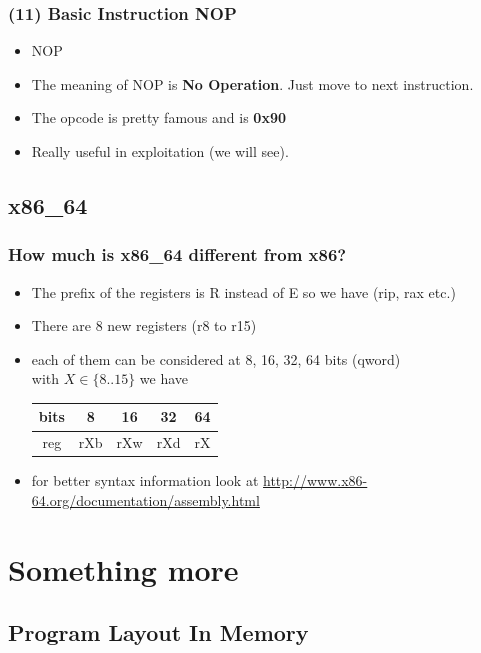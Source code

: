 \documentclass[]{beamer}
\newenvironment{changemargin}[2]{%
  \begin{list}{}{%
      \setlength{\topsep}{0pt}%
      \setlength{\leftmargin}{#1}%
      \setlength{\rightmargin}{#2}%
      \setlength{\listparindent}{\parindent}%
      \setlength{\itemindent}{\parindent}%
      \setlength{\parsep}{\parskip}%
    }%
  \item[]}{\end{list}}
\begin{document}
\begin{frame}
  \frametitle{(11) Basic Instruction NOP}
  \begin{itemize}
  \item{NOP}\\
  \item{The meaning of NOP is \textbf{No Operation}. Just move to next instruction.}
  \item{The opcode is pretty famous and is \textbf{0x90}}
  \item{Really useful in exploitation (we will see).}
  \end{itemize}
\end{frame}

\subsection{x86\_64}
\begin{frame}
  \frametitle{How much is x86\_64 different from x86?}
  \begin{changemargin}{-0.7cm}{0cm}
    \begin{itemize}
    \item{The prefix of  the registers is R instead of E so we have (rip, rax etc.)}
    \item{There are 8 new registers (r8 to r15)}
    \item{each of them can be considered at 8, 16, 32, 64 bits (qword)\\
        with $X \in \{8..15\}$ we have }
      \begin{table}[h]
        \begin{tabular}{|c!{\vrule width 1pt }c|c|c|c|}
          \hline
          bits&8&16&32&64\\
          \hline
          reg&rXb&rXw&rXd&rX\\
          \hline
        \end{tabular}
      \end{table}
    \item{for better syntax information look at \url{http://www.x86-64.org/documentation/assembly.html}}
    \end{itemize}
  \end{changemargin}
\end{frame}
\section{Something more}

\subsection{Program Layout In Memory}
\end{document}
